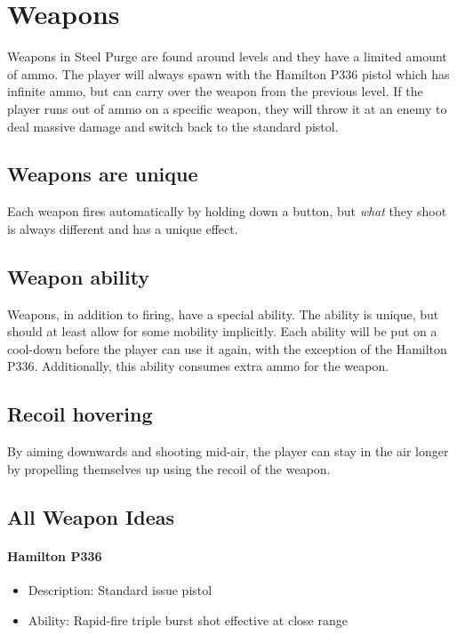 \documentclass[../Main.tex]{subfiles}
\begin{document}
\section{Weapons}

Weapons in Steel Purge are found around levels and they have a limited amount of ammo. The player will always spawn with the Hamilton P336 pistol which has infinite ammo, but can carry over the weapon from the previous level. If the player runs out of ammo on a specific weapon, they will throw it at an enemy to deal massive damage and switch back to the standard pistol. 

\subsection{Weapons are unique}

Each weapon fires automatically by holding down a button, but \emph{what} they shoot is always different and has a unique effect. 

\subsection{Weapon ability}

Weapons, in addition to firing, have a special ability. The ability is unique, but should at least allow for some mobility implicitly. Each ability will be put on a cool-down before the player can use it again, with the exception of the Hamilton P336. Additionally, this ability consumes extra ammo for the weapon.

\subsection{Recoil hovering}

By aiming downwards and shooting mid-air, the player can stay in the air longer by propelling themselves up using the recoil of the weapon. 

\subsection{All Weapon Ideas}

\paragraph{Hamilton P336}

\begin{itemize}
	\item Description: Standard issue pistol
	\item Ability: Rapid-fire triple burst shot effective at close range
\end{itemize} 
\end{document}
